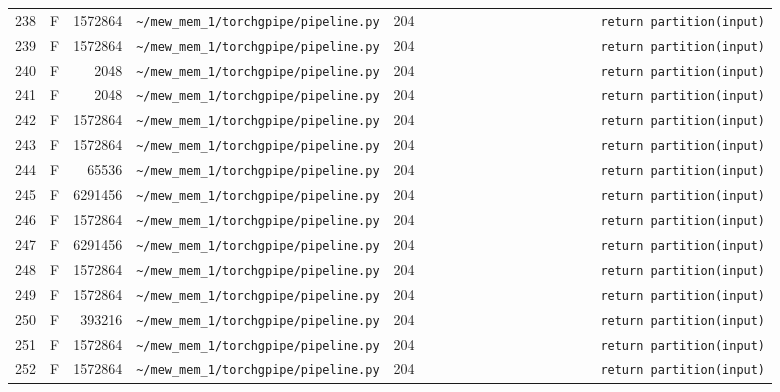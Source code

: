 \documentclass{article}
\begin{document}
\begin{longtable}{r l r p{6.5cm} r p{7.0cm}}
238 & F & 1572864 & \lstinline|~/mew_mem_1/torchgpipe/pipeline.py| & 204 & \lstinline|                        return partition(input)| \\
239 & F & 1572864 & \lstinline|~/mew_mem_1/torchgpipe/pipeline.py| & 204 & \lstinline|                        return partition(input)| \\
240 & F & 2048 & \lstinline|~/mew_mem_1/torchgpipe/pipeline.py| & 204 & \lstinline|                        return partition(input)| \\
241 & F & 2048 & \lstinline|~/mew_mem_1/torchgpipe/pipeline.py| & 204 & \lstinline|                        return partition(input)| \\
242 & F & 1572864 & \lstinline|~/mew_mem_1/torchgpipe/pipeline.py| & 204 & \lstinline|                        return partition(input)| \\
243 & F & 1572864 & \lstinline|~/mew_mem_1/torchgpipe/pipeline.py| & 204 & \lstinline|                        return partition(input)| \\
244 & F & 65536 & \lstinline|~/mew_mem_1/torchgpipe/pipeline.py| & 204 & \lstinline|                        return partition(input)| \\
245 & F & 6291456 & \lstinline|~/mew_mem_1/torchgpipe/pipeline.py| & 204 & \lstinline|                        return partition(input)| \\
246 & F & 1572864 & \lstinline|~/mew_mem_1/torchgpipe/pipeline.py| & 204 & \lstinline|                        return partition(input)| \\
247 & F & 6291456 & \lstinline|~/mew_mem_1/torchgpipe/pipeline.py| & 204 & \lstinline|                        return partition(input)| \\
248 & F & 1572864 & \lstinline|~/mew_mem_1/torchgpipe/pipeline.py| & 204 & \lstinline|                        return partition(input)| \\
249 & F & 1572864 & \lstinline|~/mew_mem_1/torchgpipe/pipeline.py| & 204 & \lstinline|                        return partition(input)| \\
250 & F & 393216 & \lstinline|~/mew_mem_1/torchgpipe/pipeline.py| & 204 & \lstinline|                        return partition(input)| \\
251 & F & 1572864 & \lstinline|~/mew_mem_1/torchgpipe/pipeline.py| & 204 & \lstinline|                        return partition(input)| \\
252 & F & 1572864 & \lstinline|~/mew_mem_1/torchgpipe/pipeline.py| & 204 & \lstinline|                        return partition(input)| \\

\end{longtable}
\end{document}
